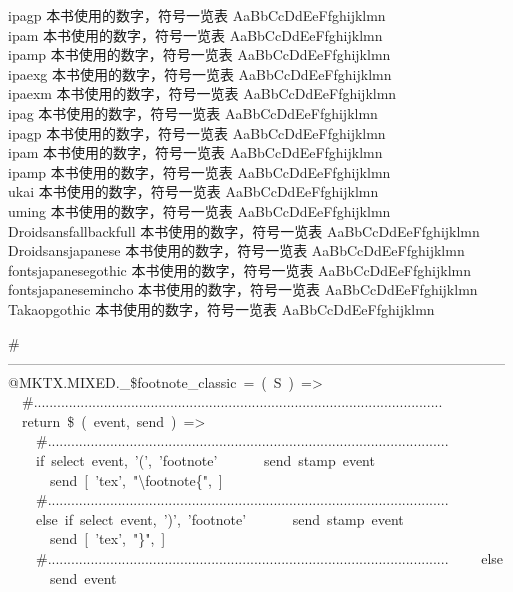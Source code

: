 ipagp {\cjk\mktsFontfileipagp{}本书使用的数字，符号一览表 AaBbCcDdEeFfghijklmn}\\
ipam {\cjk\mktsFontfileipam{}本书使用的数字，符号一览表 AaBbCcDdEeFfghijklmn}\\
ipamp {\cjk\mktsFontfileipamp{}本书使用的数字，符号一览表 AaBbCcDdEeFfghijklmn}\\
ipaexg {\cjk\mktsFontfileipaexg{}本书使用的数字，符号一览表 AaBbCcDdEeFfghijklmn}\\
ipaexm {\cjk\mktsFontfileipaexm{}本书使用的数字，符号一览表 AaBbCcDdEeFfghijklmn}\\
ipag {\cjk\mktsFontfileipag{}本书使用的数字，符号一览表 AaBbCcDdEeFfghijklmn}\\
ipagp {\cjk\mktsFontfileipagp{}本书使用的数字，符号一览表 AaBbCcDdEeFfghijklmn}\\
ipam {\cjk\mktsFontfileipam{}本书使用的数字，符号一览表 AaBbCcDdEeFfghijklmn}\\
ipamp {\cjk\mktsFontfileipamp{}本书使用的数字，符号一览表 AaBbCcDdEeFfghijklmn}\\
ukai {\cjk\mktsFontfileukai{}本书使用的数字，符号一览表 AaBbCcDdEeFfghijklmn}\\
uming {\cjk\mktsFontfileuming{}本书使用的数字，符号一览表 AaBbCcDdEeFfghijklmn}\\
Droidsansfallbackfull {\cjk\mktsFontfileDroidsansfallbackfull{}本书使用的数字，符号一览表 AaBbCcDdEeFfghijklmn}\\
Droidsansjapanese {\cjk\mktsFontfileDroidsansjapanese{}本书使用的数字，符号一览表 AaBbCcDdEeFfghijklmn}\\
fontsjapanesegothic {\cjk\mktsFontfilefontsjapanesegothic{}本书使用的数字，符号一览表 AaBbCcDdEeFfghijklmn}\\
fontsjapanesemincho {\cjk\mktsFontfilefontsjapanesemincho{}本书使用的数字，符号一览表 AaBbCcDdEeFfghijklmn}\\
Takaopgothic {\cjk\mktsFontfileTakaopgothic{}本书使用的数字，符号一览表 AaBbCcDdEeFfghijklmn}\\



\begingroup\mktsObeyAllLines{}

\begingroup\mktsStyleCode{}\#-----------------------------------------------------------------------------------------------------------
@MKTX.MIXED.\_\$footnote\_classic = ( S ) =>
  \#.........................................................................................................
  return \$ ( event, send ) =>
    \#.......................................................................................................
    if select event, '(', 'footnote'
      send stamp event
      send [ 'tex', "\textbackslash{}footnote\{", ]
    \#.......................................................................................................
    else if select event, ')', 'footnote'
      send stamp event
      send [ 'tex', "\}", ]
    \#.......................................................................................................
    else
      send event
\endgroup{}{}

\endgroup{}
